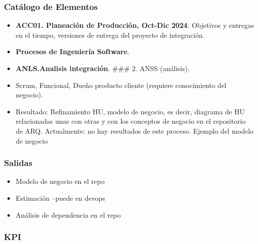 \documentclass[
  paper=a4,
  ,captions=tableheading
]{scrartcl}
\providecommand{\tightlist}{%
  \setlength{\itemsep}{0pt}\setlength{\parskip}{0pt}}
\begin{document}
\subsubsection{Catálogo de
Elementos}\label{sec:catuxe1logo-de-elementos-1}

\begin{itemize}
\item
  \textbf{ACC01. Planeación de Producción, Oct-Dic 2024}. Objetivos y
  entregas en el tiempo, versiones de entrega del proyecto de
  integración.
\item
  \textbf{Procesos de Ingeniería Software}.
\item
  \textbf{ANLS.Analisis integración}. \#\#\# 2. ANSS (análisis).
\item
  Scrum, Funcional, Dueño producto cliente (requiere conocimiento del
  negocio).
\item
  Resultado: Refinamiento HU, modelo de negocio, es decir, diagrama de
  HU relacionadas unas con otras y con los conceptos de negocio en el
  repositorio de ARQ. Actualmente: no hay resultados de este proceso.
  Ejemplo del modelo de negocio
\end{itemize}

\subsubsection{Salidas}\label{sec:salidas}

\begin{itemize}
\tightlist
\item
  Modelo de negocio en el repo
\item
  Estimación --puede en devops
\item
  Análisis de dependencia en el repo
\end{itemize}

\subsubsection{KPI}\label{sec:kpi}
\end{document}

